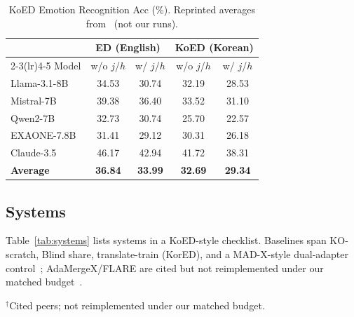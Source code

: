 \documentclass[journal]{IEEEtran}
\begin{document}
\begin{table}[!t]
\caption{KoED Emotion Recognition Acc (\%). Reprinted averages from~\cite{lee2025koed} (not our runs).}
\label{tab:koed_anchor}
\centering
\setlength{\tabcolsep}{3.5pt}
\begin{tabular}{@{}lcccc@{}}
\toprule
& \multicolumn{2}{c}{ED (English)} & \multicolumn{2}{c}{KoED (Korean)} \\
\cmidrule(lr){2-3}\cmidrule(lr){4-5}
Model & w/o $j$/$h$ & w/ $j$/$h$ & w/o $j$/$h$ & w/ $j$/$h$ \\
\midrule
Llama-3.1-8B & 34.53 & 30.74 & 32.19 & 28.53 \\
Mistral-7B & 39.38 & 36.40 & 33.52 & 31.10 \\
Qwen2-7B & 32.73 & 30.74 & 25.70 & 22.57 \\
EXAONE-7.8B & 31.41 & 29.12 & 30.31 & 26.18 \\
Claude-3.5 & 46.17 & 42.94 & 41.72 & 38.31 \\
\midrule
\textbf{Average} & \textbf{36.84} & \textbf{33.99} & \textbf{32.69} & \textbf{29.34} \\
\bottomrule
\end{tabular}
\end{table}

\subsection{Systems}
Table~\ref{tab:systems} lists systems in a KoED-style checklist.
Baselines span KO-scratch, Blind share, translate-train (KorED), and a MAD-X-style dual-adapter control~\cite{pfeiffer2020madx}; AdaMergeX/FLARE are cited but not reimplemented under our matched budget~\cite{zhao2025adamerge,borchert2025flare}.

\begin{table}[!t]
\caption{Systems Compared (Direction I/II)}
\label{tab:systems}
\centering
{}
\end{table}
{\footnotesize $^\dagger$Cited peers; not reimplemented under our matched budget.}
\end{document}
